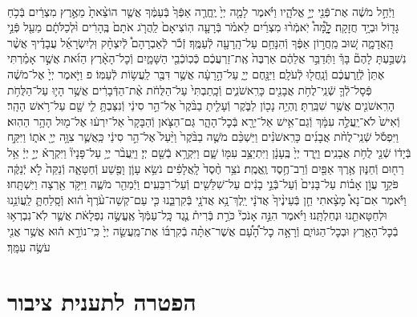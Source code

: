 \documentclass[twoside, openany, parskip=half, 11pt]{book}
\begin{document}
\begin{footnotesize}
\begin{multicols}{2}
\\
וַיְֿחַ֣ל מֹשֶׁ֔ה אֶת־פְּֿנֵ֖י יְיָ֣ אֱלֹהָ֑יו וַיֹּ֗אמֶר לָמָ֤ה יְיָ֙ יֶֽחֱרֶ֤ה אַפְּֿךָ֙ בְּֿעַמֶּ֔ךָ אֲשֶׁ֤ר הוֹצֵ֨אתָ֙ מֵאֶ֣רֶץ מִצְרַ֔יִם בְּֿכֹ֥חַ גָּד֖וֹל וּבְיָ֥ד חֲזָקָֽה׃ לׇׇׇׇָ֩מָּה֩ יֹֽאמְֿר֨וּ מִצְרַ֜יִם לֵאמֹ֗ר בְּֿרָעָ֤ה הֽוֹצִיאָם֙ לַֽהֲרֹ֤ג אֹתָם֙ בֶּֽהָרִ֔ים וּ֨לְכַלֹּתָ֔ם מֵעַ֖ל פְּֿנֵ֣י הָֽאֲדָמָ֑ה שׁ֚וּב מֵֽחֲר֣וֹן אַפֶּ֔ךָ וְֿהִנָּחֵ֥ם עַל־הָֽרָעָ֖ה לְֿעַמֶּֽךָ׃ זְֿכֹ֡ר לְֿאַבְרָהָם֩ לְֿיִצְחָ֨ק וּֽלְיִשְׂרָאֵ֜ל עֲבָדֶ֗יךָ אֲשֶׁ֨ר נִשְׁבַּ֣עְתָּ לָהֶם֘ בָּךְ֒ וַתְּֿדַבֵּ֣ר אֲלֵהֶ֔ם אַרְבֶּה֙ אֶֽת־זַרְעֲכֶ֔ם כְּֿכֽוֹכְֿבֵ֖י הַשָּׁמָ֑יִם וְֿכׇל־הָאָ֨רֶץ הַזֹּ֜את אֲשֶׁ֣ר אָמַ֗רְתִּי אֶתֵּן֙ לְֿזַֽרְעֲכֶ֔ם וְֿנָֽחֲל֖וּ לְֿעֹלָֽם׃ וַיִּנָּ֖חֶם יְיָ֑ עַל־הָ֣רָעָ֔ה אֲשֶׁ֥ר דִּבֶּ֖ר לַֽעֲשׂ֥וֹת לְֿעַמּֽוֹ׃ פ
וַיֹּ֤אמֶר יְיָ֙ אֶל־מֹשֶׁ֔ה פְּֿסָל־לְֿךָ֛ שְֿׁנֵֽי־לֻחֹ֥ת אֲבָנִ֖ים כָּרִֽאשֹׁנִ֑ים וְֿכָֽתַבְתִּי֙ עַל־הַלֻּחֹ֔ת אֶ֨ת־הַדְּֿבָרִ֔ים אֲשֶׁ֥ר הָי֛וּ עַל־הַלֻּחֹ֥ת הָרִֽאשֹׁנִ֖ים אֲשֶׁ֥ר שִׁבַּֽרְתָּ׃ וֶהְיֵ֥ה נָכ֖וֹן לַבֹּ֑קֶר וְֿעָלִ֤יתָ בַבֹּ֨קֶר֙ אֶל־הַ֣ר סִינַ֔י וְֿנִצַּבְתָּ֥ לִ֛י שָׁ֖ם עַל־רֹ֥אשׁ הָהָֽר׃ וְֿאִישׁ֙ לֹא־יַֽעֲלֶ֣ה עִמָּ֔ךְ וְֿגַם־אִ֥ישׁ אַל־יֵרָ֖א בְּֿכׇל־הָהָ֑ר גַּם־הַצֹּ֤אן וְֿהַבָּקָר֙ אַל־יִרְע֔וּ אֶל־מ֖וּל הָהָ֥ר הַהֽוּא׃ 
וַיִּפְסֹ֡ל שְֿׁנֵֽי־לֻחֹ֨ת אֲבָנִ֜ים כָּרִֽאשֹׁנִ֗ים וַיַּשְׁכֵּ֨ם מֹשֶׁ֤ה בַבֹּ֨קֶר֙ וַיַּ֨עַל֙ אֶל־הַ֣ר סִינַ֔י כַּֽאֲשֶׁ֛ר צִוָּ֥ה יְיָ֖ אֹת֑וֹ וַיִּקַּ֣ח בְּֿיָד֔וֹ שְֿׁנֵ֖י לֻחֹ֥ת אֲבָנִֽים׃ וַיֵּ֤רֶד יְיָ֙ בֶּֽעָנָ֔ן וַיִּתְיַצֵּ֥ב עִמּ֖וֹ שָׁ֑ם וַיִּקְרָ֥א בְֿשֵׁ֖ם יְיָ׃ וַיַּֽעֲבֹ֨ר יְיָ֥ עַל־פָּנָיו֘ וַיִּקְרָא֒ יְיָ֣ יְיָ֔ אֵ֥ל רַח֖וּם וְֿחַנּ֑וּן אֶ֥רֶךְ אַפַּ֖יִם וְֿרַב־חֶ֥סֶד וֶֽאֱמֶֽת׃ נֹצֵ֥ר חֶ֨סֶד֙ לָֽאֲלָפִ֔ים נֹשֵׂ֥א עָוֹ֛ן וָפֶ֖שַׁע וְֿחַטָּאָ֑ה וְֿנַקֵּה֙ לֹ֣א יְֿנַקֶּ֔ה פֹּקֵ֣ד עֲוֹ֣ן אָב֗וֹת עַל־בָּנִים֙ וְֿעַל־בְּֿנֵ֣י בָנִ֔ים עַל־שִׁלֵּשִׁ֖ים וְֿעַל־רִבֵּעִֽים׃ וַיְֿמַהֵ֖ר מֹשֶׁ֑ה וַיִּקֹּ֥ד אַ֖רְצָה וַיִּשְׁתָּֽחוּ׃ וַיֹּ֡אמֶר אִם־נָא֩ מָצָ֨אתִי חֵ֤ן בְּֿעֵינֶ֨יךָ֙ אֲדֹנָ֔י יֵֽלֶךְ־נָ֥א אֲדֹנָ֖י בְּֿקִרְבֵּ֑נוּ כִּ֤י עַם־קְשֵׁה־עֹ֨רֶף֙ ה֔וּא וְֿסָֽלַחְתָּ֛ לַֽעֲוֹנֵ֥נוּ וּלְחַטָּאתֵ֖נוּ וּנְחַלְתָּֽנוּ׃ וַיֹּ֗אמֶר הִנֵּ֣ה אָנֹכִי֘ כֹּרֵ֣ת בְּֿרִית֒ נֶ֤גֶד כָּֽל־עַמְּֿךָ֙ אֶֽעֱשֶׂ֣ה נִפְלָאֹ֔ת אֲשֶׁ֛ר לֹֽא־נִבְרְא֥וּ בְֿכׇל־הָאָ֖רֶץ וּבְכׇל־הַגּוֹיִ֑ם וְֿרָאָ֣ה כׇל־הָ֠עָ֠ם אֲשֶׁר־אַתָּ֨ה בְֿקִרְבּ֜וֹ אֶת־מַֽעֲשֵׂ֤ה יְיָ֙ כִּֽי־נוֹרָ֣א ה֔וּא אֲשֶׁ֥ר אֲנִ֖י עֹשֶׂ֥ה עִמָּֽךְ׃

\end{multicols}

\section*{הפטרה לתענית ציבור}



\end{footnotesize}
\end{document}
